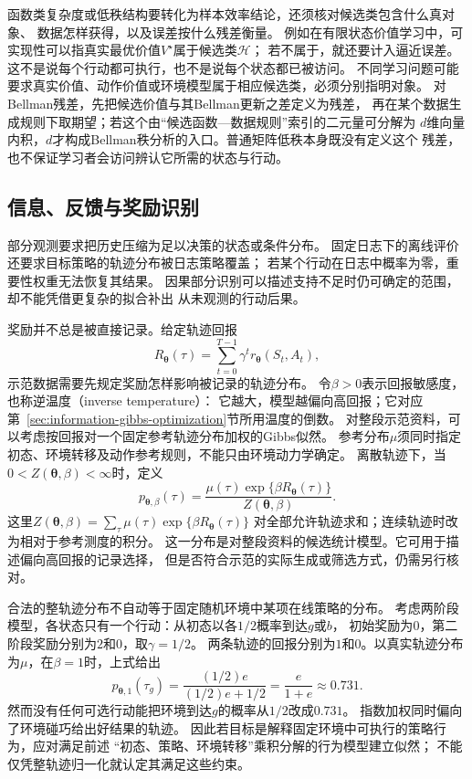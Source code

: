 函数类复杂度或低秩结构要转化为样本效率结论，还须核对候选类包含什么真对象、
数据怎样获得，以及误差按什么残差衡量。
例如在有限状态价值学习中，可实现性可以指真实最优价值$V^\star$属于候选类$\mathcal H$；
若不属于，就还要计入逼近误差。这不是说每个行动都可执行，也不是说每个状态都已被访问。
不同学习问题可能要求真实价值、动作价值或环境模型属于相应候选类，必须分别指明对象。
对Bellman残差，先把候选价值与其Bellman更新之差定义为残差，
再在某个数据生成规则下取期望；若这个由“候选函数—数据规则”索引的二元量可分解为
$d$维向量内积，$d$才构成Bellman秩分析的入口。普通矩阵低秩本身既没有定义这个
残差，也不保证学习者会访问辨认它所需的状态与行动。

\subsection{信息、反馈与奖励识别}
\label{sec:future-information-feedback-identifiability}

部分观测要求把历史压缩为足以决策的状态或条件分布。
固定日志下的离线评价还要求目标策略的轨迹分布被日志策略覆盖；
若某个行动在日志中概率为零，重要性权重无法恢复其结果。
因果部分识别可以描述支持不足时仍可确定的范围，却不能凭借更复杂的拟合补出
从未观测的行动后果。

奖励并不总是被直接记录。给定轨迹回报
\[
  R_{\bm\theta}(\tau)
  =
  \sum_{t=0}^{T-1}\gamma^t
  r_{\bm\theta}(S_t,A_t),
\]
示范数据需要先规定奖励怎样影响被记录的轨迹分布。
令$\beta>0$表示回报敏感度，也称逆温度（inverse temperature）：
它越大，模型越偏向高回报；它对应
第~\ref{sec:information-gibbs-optimization}节所用温度的倒数。
对整段示范资料，可以考虑按回报对一个固定参考轨迹分布加权的Gibbs似然。
参考分布$\mu$须同时指定初态、环境转移及动作参考规则，不能只由环境动力学确定。
离散轨迹下，当$0<Z(\bm\theta,\beta)<\infty$时，定义
\[
  p_{\bm\theta,\beta}(\tau)
  =
  \frac{
    \mu(\tau)\exp\{\beta R_{\bm\theta}(\tau)\}
  }{
    Z(\bm\theta,\beta)
  }.
\]
这里$Z(\bm\theta,\beta)=\sum_\tau\mu(\tau)\exp\{\beta R_{\bm\theta}(\tau)\}$
对全部允许轨迹求和；连续轨迹时改为相对于参考测度的积分。
这一分布是对整段资料的候选统计模型。它可用于描述偏向高回报的记录选择，
但是否符合示范的实际生成或筛选方式，仍需另行核对。

合法的整轨迹分布不自动等于固定随机环境中某项在线策略的分布。
考虑两阶段模型，各状态只有一个行动：从初态以各$1/2$概率到达$g$或$b$，
初始奖励为$0$，第二阶段奖励分别为$2$和$0$，取$\gamma=1/2$。
两条轨迹的回报分别为$1$和$0$。以真实轨迹分布为$\mu$，在$\beta=1$时，上式给出
\[
 p_{\bm\theta,1}(\tau_g)=\frac{(1/2)e}{(1/2)e+1/2}
 =\frac{e}{1+e}\approx0.731.
\]
然而没有任何可选行动能把环境到达$g$的概率从$1/2$改成$0.731$。
指数加权同时偏向了环境碰巧给出好结果的轨迹。
因此若目标是解释固定环境中可执行的策略行为，应对满足前述
“初态、策略、环境转移”乘积分解的行为模型建立似然；
不能仅凭整轨迹归一化就认定其满足这些约束。

